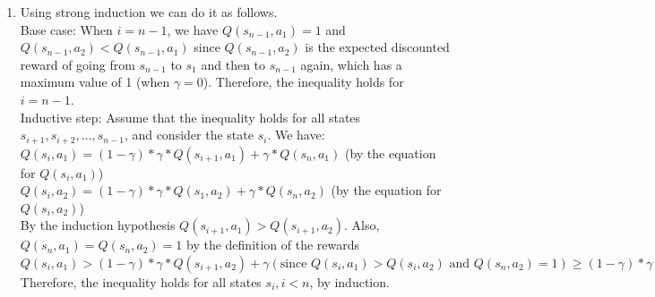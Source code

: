 \documentclass{article}
\theoremstyle{definition}
\theoremstyle{remark}
\begin{document}
\begin{enumerate}[font={\Large\bfseries},left=0pt]
\begin{enumerate}
  \item[(c)] Using strong induction we can do it as follows.\\
  Base case: When $i = n-1$, we have $Q(s_{n-1}, a_1) = 1$ and $Q(s_{n-1}, a_2) < Q(s_{n-1}, a_1)$ since $Q(s_{n-1}, a_2)$ is the expected discounted reward of 
  going from $s_{n-1}$ to $s_1$ and then to $s_{n-1}$ again, which has a maximum value of 1 (when $\gamma = 0$). Therefore, the inequality holds for $i = n-1$.\\
  Inductive step: Assume that the inequality holds for all states $s_{i+1}, s_{i+2}, \ldots, s_{n-1}$, and consider the state $s_i$. We have:\\
  $Q(s_i, a_1) = (1-\gamma) * \gamma * Q(s_{i+1}, a_1) + \gamma * Q(s_n, a_1)$ (by the equation for $Q(s_i, a_1)$)\\
  $Q(s_i, a_2) = (1-\gamma) * \gamma * Q(s_1, a_2) + \gamma * Q(s_n, a_2)$ (by the equation for $Q(s_i, a_2)$)\\
  By the induction hypothesis $Q(s_{i+1}, a_1) > Q(s_{i+1}, a_2)$. Also, $Q(s_n, a_1) = Q(s_n, a_2) = 1$ by the definition of the rewards\\
  $Q(s_i, a_1) > (1-\gamma) * \gamma * Q(s_{i+1}, a_2) + \gamma (\text{since } Q(s_i, a_1) > Q(s_i, a_2) \text{ and } Q(s_n, a_2) = 1)
  \geq (1-\gamma) * \gamma * Q(s_1, a_2) + \gamma (\text{since } Q(s_{i+1}, a_2) \geq Q(s_1, a_2) \forall i < n-1) = Q(s_i, a_2)$\\
  Therefore, the inequality holds for all states $s_i, i < n$, by induction.


\end{enumerate}
\end{enumerate}
\end{document}
